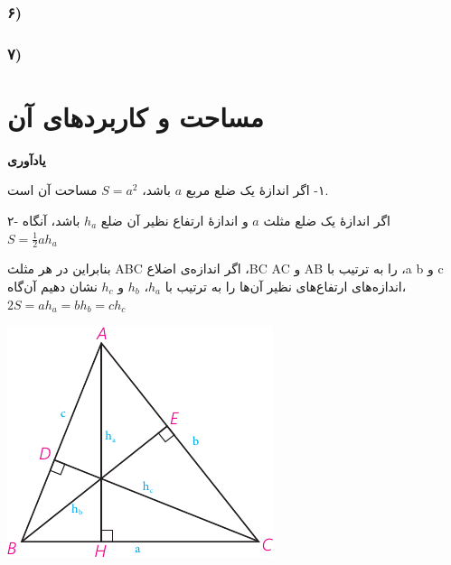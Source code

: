 \documentclass[12pt, a4paper]{book}
\begin{document}
	\subsubsection[6]{۶)}
	
	\subsubsection[7]{۷)}
	



\newpage
\section{مساحت و کاربردهای آن}

\textbf{یادآوری}

\begin{minipage}{0.65\textwidth}
	١- اگر اندازهٔ یک ضلع مربع $a$ باشد، $S=a^2$ مساحت آن است.
	
	۲- اگر اندازهٔ یک ضلع مثلث $a$ و اندازهٔ ارتفاع نظیر آن ضلع $h_a$ باشد، آنگاه \\
	$S=\frac12 ah_a$
	
	بنابراین در هر مثلث ABC اگر اندازه‌ی اضلاع ،BC AC و AB را به ترتیب با ،a b و c اندازه‌های ارتفاع‌های نظیر آن‌ها را به ترتیب با $h_a$، $h_b$ و $h_c$ نشان دهیم آن‌گاه، $2S = ah_a = bh_b = ch_c$
	\end{minipage}
\begin{minipage}{0.3\textwidth}
\begin{flushleft}
		\includegraphics{"Shapes/Fasl - 3/Dars 2/P65-S1"}
\end{flushleft}
\end{minipage}
\end{document}
